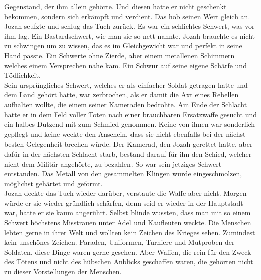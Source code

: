 Gegenstand, der ihm allein gehörte. Und diesen hatte er nicht geschenkt bekommen, sondern sich 
erkämpft und verdient. Das hob seinen Wert gleich an. Jozah seufzte und schlug das Tuch zurück. Es 
war ein schlichtes Schwert, was vor ihm lag. Ein Bastardschwert, wie man sie so nett nannte. Jozah 
brauchte es nicht zu schwingen um zu wissen, das es im Gleichgewicht war und perfekt in seine Hand 
passte. Ein Schwerte ohne Zierde, aber einem metallenen Schimmern welches einem Versprechen nahe 
kam. Ein Schwur auf seine eigene Schärfe und Tödlichkeit. \\
Sein ursprüngliches Schwert, welches er als einfacher Soldat getragen hatte und dem Land gehört 
hatte, war zerbrochen, als er damit die Axt eines Rebellen aufhalten wollte, die einem seiner 
Kameraden bedrohte. Am Ende der Schlacht hatte er in dem Feld voller Toten nach einer brauchbaren 
Ersatzwaffe gesucht und ein halbes Dutzend mit zum Schmied genommen. Keine von ihnen war sonderlich 
gepflegt und keine weckte den Anschein, dass sie nicht ebenfalls bei der nächst besten Gelegenheit 
brechen würde. Der Kamerad, den Jozah gerettet hatte, aber dafür in der nächsten Schlacht starb, 
bestand darauf für ihn den Schied, welcher nicht dem Militär angehörte, zu bezahlen. So war sein 
jetziges Schwert entstanden. Das Metall von den gesammelten Klingen wurde eingeschmolzen, möglichst 
gehärtet und geformt. \\
Jozah deckte das Tuch wieder darüber, verstaute die Waffe aber nicht. Morgen würde er sie wieder 
gründlich schärfen, denn seid er wieder in der Hauptstadt war, hatte er sie kaum angerührt. Selbst 
blinde wussten, dass man mit so einem Schwert höchstens Misstrauen unter Adel und Kaufleuten 
weckte. Die Menschen lebten gerne in ihrer Welt und wollten kein Zeichen des Krieges sehen. 
Zumindest kein unschönes Zeichen. Paraden, Uniformen, Turniere und Mutproben der Soldaten, diese 
Dinge waren gerne gesehen. Aber Waffen, die rein für den Zweck des Tötens und nicht des hübschen 
Anblicks geschaffen waren, die gehörten nicht zu dieser Vorstellungen der Menschen.\\

